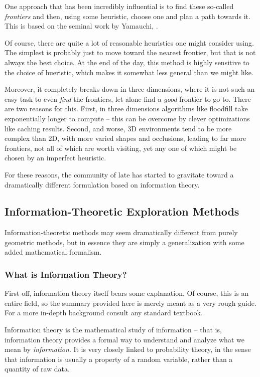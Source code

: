 \documentclass[12pt]{article}
\begin{document}
One approach that has been incredibly influential is to find these so-called \textit{frontiers} and then, using some heuristic, choose one and plan a path towards it. This is based on the seminal work by Yamauchi, \cite{yamauchi}.

Of course, there are quite a lot of reasonable heuristics one might consider using. The simplest is probably just to move toward the nearest frontier, but that is not always the best choice. At the end of the day, this method is highly sensitive to the choice of hueristic, which makes it somewhat less general than we might like.

Moreover, it completely breaks down in three dimensions, where it is not such an easy task to even \textit{find} the frontiers, let alone find a \textit{good} frontier to go to. There are two reasons for this. First, in three dimensions algorithms like floodfill take exponentially longer to compute -- this can be overcome by clever optimizations like caching results. Second, and worse, 3D environments tend to be more complex than 2D, with more varied shapes and occlusions, leading to far more frontiers, not all of which are worth visiting, yet any one of which might be chosen by an imperfect heuristic.

For these reasons, the community of late has started to gravitate toward a dramatically different formulation based on information theory.

\subsection{Information-Theoretic Exploration Methods}

Information-theoretic methods may seem dramatically different from purely geometric methods, but in essence they are simply a generalization with some added mathematical formalism.

\subsubsection{What is Information Theory?}

First off, information theory itself bears some explanation. Of course, this is an entire field, so the summary provided here is merely meant as a very rough guide. For a more in-depth background consult any standard textbook.

Information theory is the mathematical study of information -- that is, information theory provides a formal way to understand and analyze what we mean by \textit{information}. It is very closely linked to probability theory, in the sense that information is usually a property of a random variable, rather than a quantity of raw data.
\end{document}
